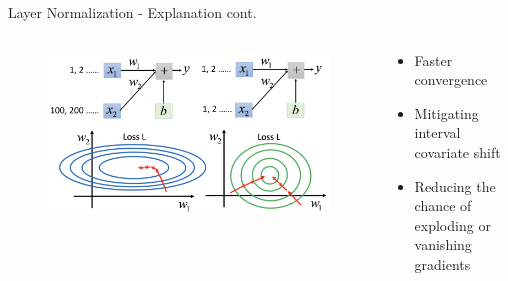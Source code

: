 \documentclass[aspectratio=169,xcolor=dvipsnames]{beamer}
\begin{document}
\begin{frame}{Layer Normalization - Explanation cont.} 
    \begin{columns}
        \begin{column}{0.65\textwidth}
            \begin{figure}
                \centering
                \includegraphics[width=\textwidth]{figures/normalized_gradient_descent.png}
                \label{normalized_gradient_descent}
            \end{figure}
        \end{column}
        \begin{column}{0.35\textwidth}
            \begin{itemize}
                \item Faster convergence
                \item Mitigating interval covariate shift
                \item Reducing the chance of exploding or vanishing gradients
            \end{itemize}
        \end{column}
    \end{columns}
\end{frame}

\end{document}
